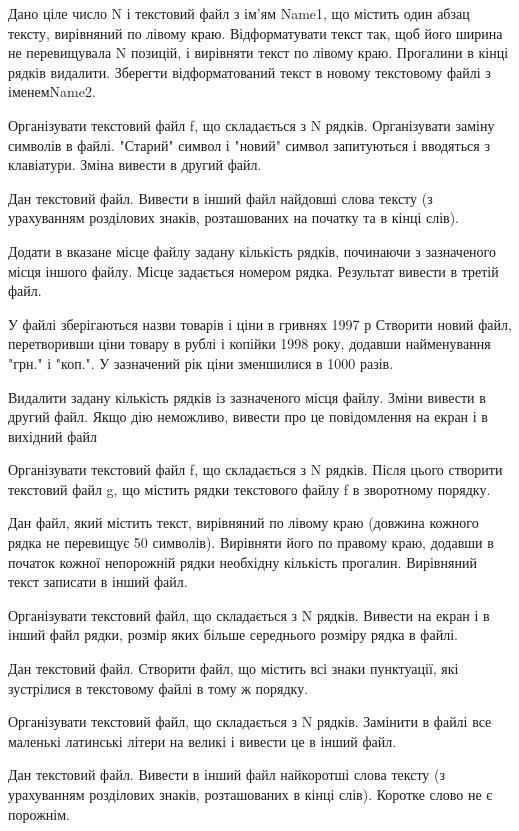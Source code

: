 \documentclass[]{article}
\begin{document}
Дано ціле число N і текстовий файл з ім'ям Name1, що містить один абзац
тексту, вирівняний по лівому краю. Відформатувати текст так, щоб його
ширина не перевищувала N позицій, і вирівняти текст по лівому краю.
Прогалини в кінці рядків видалити. Зберегти відформатований текст в
новому текстовому файлі з іменемName2.

Організувати текстовий файл f, що складається з N рядків. Організувати
заміну символів в файлі. "Старий" символ і "новий" символ запитуються і
вводяться з клавіатури. Зміна вивести в другий файл.

Дан текстовий файл. Вивести в інший файл найдовші слова тексту (з
урахуванням розділових знаків, розташованих на початку та в кінці слів).

Додати в вказане місце файлу задану кількість рядків, починаючи з
зазначеного місця іншого файлу. Місце задається номером рядка. Результат
вивести в третій файл.

У файлі зберігаються назви товарів і ціни в гривнях 1997 р Створити
новий файл, перетворивши ціни товару в рублі і копійки 1998 року,
додавши найменування "грн." і "коп.". У зазначений рік ціни зменшилися в
1000 разів.

Видалити задану кількість рядків із зазначеного місця файлу. Зміни
вивести в другий файл. Якщо дію неможливо, вивести про це повідомлення
на екран і в вихідний файл

Організувати текстовий файл f, що складається з N рядків. Після цього
створити текстовий файл g, що містить рядки текстового файлу f в
зворотному порядку.

Дан файл, який містить текст, вирівняний по лівому краю (довжина кожного
рядка не перевищує 50 символів). Вирівняти його по правому краю, додавши
в початок кожної непорожній рядки необхідну кількість прогалин.
Вирівняний текст записати в інший файл.

Організувати текстовий файл, що складається з N рядків. Вивести на екран
і в інший файл рядки, розмір яких більше середнього розміру рядка в
файлі.

Дан текстовий файл. Створити файл, що містить всі знаки пунктуації, які
зустрілися в текстовому файлі в тому ж порядку.

Організувати текстовий файл, що складається з N рядків. Замінити в файлі
все маленькі латинські літери на великі і вивести це в інший файл.

Дан текстовий файл. Вивести в інший файл найкоротші слова тексту (з
урахуванням розділових знаків, розташованих в кінці слів). Коротке слово
не є порожнім.
\end{document}
